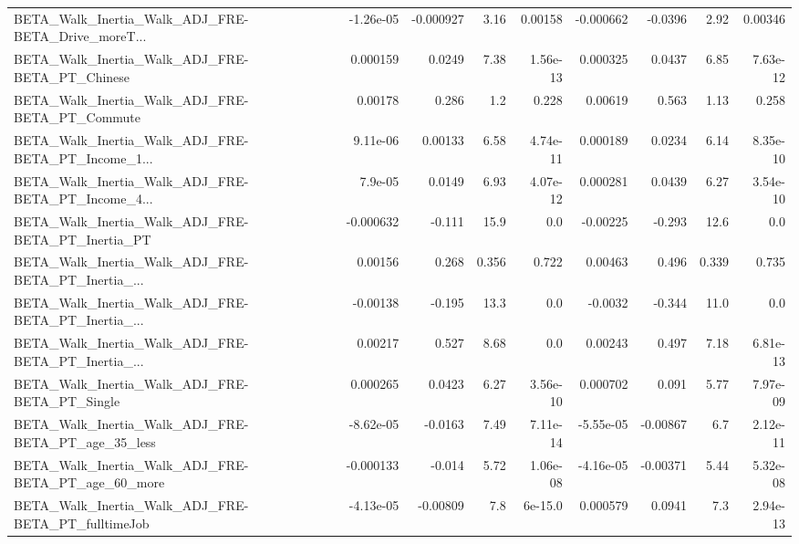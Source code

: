 \begin{tabular}{lrrrrrrrr}
BETA\_Walk\_Inertia\_Walk\_ADJ\_FRE-BETA\_Drive\_moreT... &   -1.26e-05 &    -0.000927 &     3.16 &  0.00158 &  -0.000662 &     -0.0396 &         2.92 &       0.00346 \\
BETA\_Walk\_Inertia\_Walk\_ADJ\_FRE-BETA\_PT\_Chinese     &    0.000159 &       0.0249 &     7.38 & 1.56e-13 &   0.000325 &      0.0437 &         6.85 &      7.63e-12 \\
BETA\_Walk\_Inertia\_Walk\_ADJ\_FRE-BETA\_PT\_Commute     &     0.00178 &        0.286 &      1.2 &    0.228 &    0.00619 &       0.563 &         1.13 &         0.258 \\
BETA\_Walk\_Inertia\_Walk\_ADJ\_FRE-BETA\_PT\_Income\_1... &    9.11e-06 &      0.00133 &     6.58 & 4.74e-11 &   0.000189 &      0.0234 &         6.14 &      8.35e-10 \\
BETA\_Walk\_Inertia\_Walk\_ADJ\_FRE-BETA\_PT\_Income\_4... &     7.9e-05 &       0.0149 &     6.93 & 4.07e-12 &   0.000281 &      0.0439 &         6.27 &      3.54e-10 \\
BETA\_Walk\_Inertia\_Walk\_ADJ\_FRE-BETA\_PT\_Inertia\_PT  &   -0.000632 &       -0.111 &     15.9 &      0.0 &   -0.00225 &      -0.293 &         12.6 &           0.0 \\
BETA\_Walk\_Inertia\_Walk\_ADJ\_FRE-BETA\_PT\_Inertia\_... &     0.00156 &        0.268 &    0.356 &    0.722 &    0.00463 &       0.496 &        0.339 &         0.735 \\
BETA\_Walk\_Inertia\_Walk\_ADJ\_FRE-BETA\_PT\_Inertia\_... &    -0.00138 &       -0.195 &     13.3 &      0.0 &    -0.0032 &      -0.344 &         11.0 &           0.0 \\
BETA\_Walk\_Inertia\_Walk\_ADJ\_FRE-BETA\_PT\_Inertia\_... &     0.00217 &        0.527 &     8.68 &      0.0 &    0.00243 &       0.497 &         7.18 &      6.81e-13 \\
BETA\_Walk\_Inertia\_Walk\_ADJ\_FRE-BETA\_PT\_Single      &    0.000265 &       0.0423 &     6.27 & 3.56e-10 &   0.000702 &       0.091 &         5.77 &      7.97e-09 \\
BETA\_Walk\_Inertia\_Walk\_ADJ\_FRE-BETA\_PT\_age\_35\_less &   -8.62e-05 &      -0.0163 &     7.49 & 7.11e-14 &  -5.55e-05 &    -0.00867 &          6.7 &      2.12e-11 \\
BETA\_Walk\_Inertia\_Walk\_ADJ\_FRE-BETA\_PT\_age\_60\_more &   -0.000133 &       -0.014 &     5.72 & 1.06e-08 &  -4.16e-05 &    -0.00371 &         5.44 &      5.32e-08 \\
BETA\_Walk\_Inertia\_Walk\_ADJ\_FRE-BETA\_PT\_fulltimeJob &   -4.13e-05 &     -0.00809 &      7.8 &  6e-15.0 &   0.000579 &      0.0941 &          7.3 &      2.94e-13 \\

\end{tabular}
